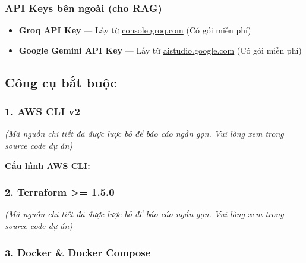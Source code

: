 \hypertarget{api-keys-buxean-ngouxe0i-cho-rag}{%
\subsubsection{API Keys bên ngoài (cho
RAG)}}

\begin{itemize}
\tightlist
\item
  \textbf{Groq API Key} --- Lấy từ
  \href{https://console.groq.com/}{console.groq.com} (Có gói miễn phí)
\item
  \textbf{Google Gemini API Key} --- Lấy từ
  \href{https://aistudio.google.com/}{aistudio.google.com} (Có gói miễn
  phí)
\end{itemize}

\hypertarget{cuxf4ng-cux1ee5-bux1eaft-buux1ed9c}{%
\subsection{Công cụ bắt buộc}}

\hypertarget{aws-cli-v2}{%
\subsubsection{1. AWS CLI v2}}

\emph{(Mã nguồn chi tiết đã được lược bỏ để báo cáo ngắn gọn. Vui lòng
xem trong source code dự án)}

\textbf{Cấu hình AWS CLI:}

\begin{Shaded}
\begin{Highlighting}[]
\end{Highlighting}
\end{Shaded}

\hypertarget{terraform-1.5.0}{%
\subsubsection{2. Terraform \textgreater= 1.5.0}}

\emph{(Mã nguồn chi tiết đã được lược bỏ để báo cáo ngắn gọn. Vui lòng
xem trong source code dự án)}

\hypertarget{docker-docker-compose}{%
\subsubsection{3. Docker \& Docker
Compose}}


